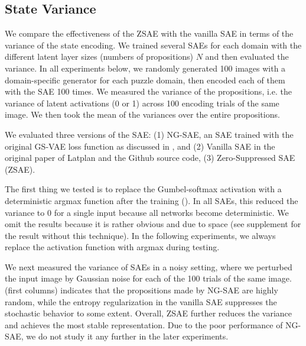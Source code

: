 \subsection{State Variance}

We compare the effectiveness of the ZSAE with the vanilla SAE in terms of the variance of the state encoding.
We trained several SAEs for each domain with the different latent layer sizes (numbers of propositions) $N$
and then evaluated the variance.
In all experiments below,
we randomly generated 100 images with a domain-specific generator for each puzzle domain,
then encoded each of them with the SAE 100 times.
We measured the variance of the propositions, i.e. the variance of latent activations (0 or 1)
across 100 encoding trials of the same image.
We then took the mean of the variances over the entire propositions.

We evaluated three versions of the SAE:
(1) NG-SAE, an SAE trained with the original GS-VAE loss function as discussed in , and
(2) Vanilla SAE in the original paper of Latplan \cite{Asai2018} and the Github source code,
(3) Zero-Suppressed SAE (ZSAE).

The first thing we tested is to replace the Gumbel-softmax activation with a deterministic argmax function
after the training ().
In all SAEs, this reduced the variance to 0 for a single input because all networks become deterministic.
We omit the results because it is rather obvious and due to space
(see supplement  for the result without this technique).
In the following experiments, we always replace the activation function with argmax during testing.

We next measured the variance of SAEs in a noisy setting, where
we perturbed the input image by Gaussian noise for each of the 100 trials of the same image.
 (first columns) indicates that
the propositions made by NG-SAE are highly random,
while the entropy regularization in the vanilla SAE suppresses the stochastic behavior to some extent.
Overall, ZSAE further reduces the variance and achieves the most stable representation.
% 
Due to the poor performance of NG-SAE, we do not study it any further in the later experiments.


